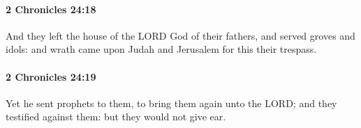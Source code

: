 		\paragraph{2 Chronicles 24:18} %
			\label{2CHRONICLES-24-18}

			And they left the house of the LORD God of their fathers, and served groves and idols: and wrath came upon Judah and Jerusalem for this their trespass.


		\paragraph{2 Chronicles 24:19} %
			\label{2CHRONICLES-24-19}

			Yet he sent prophets to them, to bring them again unto the LORD; and they testified against them: but they would not give ear.


